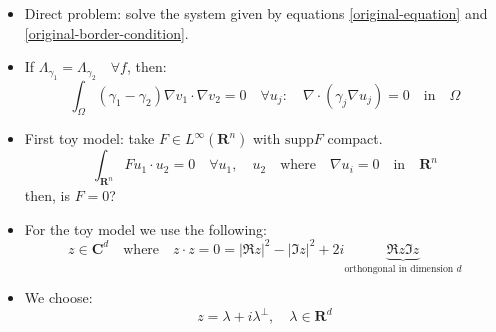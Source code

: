 \documentclass{article}
\begin{document}
\begin{itemize}
    \item Direct problem: solve the system given by equations \ref{original-equation} and \ref{original-border-condition}.

    \item If $\Lambda_{\gamma_1} = \Lambda_{\gamma_2} \quad \forall f$, then:
    \begin{equation}
        \int_{\Omega} (\gamma_1 - \gamma_2) \nabla v_1 \cdot \nabla v_2 = 0 
        \quad \forall u_j: \quad \nabla \cdot (\gamma_j \nabla u_j) = 0 \quad \text{in} \quad \Omega
    \end{equation}

    \item First toy model: take $F \in L^\infty (\mathbf{R}^n)$ with $\text{supp} F$ compact.
    \begin{equation}
        \int_{\mathbf{R}^n} F u_1 \cdot u_2 = 0 
        \quad \forall u_1, \quad u_2 \quad \text{where} \quad \nabla u_i = 0 \quad \text{in} \quad \mathbf{R}^n
    \end{equation}
    then, is $F=0$?

    \item For the toy model we use the following:
    \begin{equation}
        z \in \mathbf{C}^d \quad \text{where} \quad z \cdot z = 0 = |\Re z|^2 - |\Im z|^2 + 2i\underbrace{\Re z \Im z}_{\text{orthongonal in dimension $d$}}
    \end{equation}

    \item We choose:
    \begin{equation}
        z = \lambda + i\lambda^{\perp}, \quad \lambda \in \mathbf{R}^d
    \end{equation}
\end{itemize}
 

\end{document}
